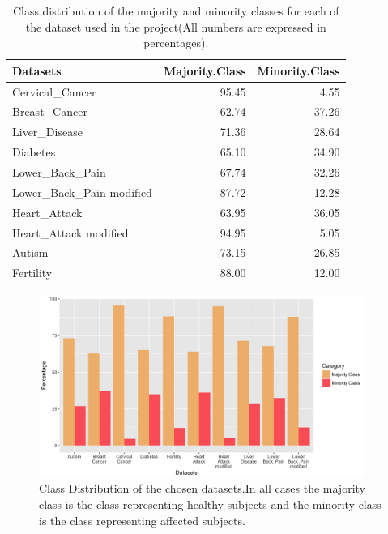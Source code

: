 \begin{table}[!htbp]
\centering
\begin{tabular}{lrr}
  \hline
  \rowcolor{LightCyan}
Datasets & Majority.Class & Minority.Class \\ 
  \hline
Cervical\_Cancer & 95.45 & 4.55 \\ 
  Breast\_Cancer & 62.74 & 37.26 \\ 
  Liver\_Disease & 71.36 & 28.64 \\ 
  Diabetes & 65.10 & 34.90 \\ 
  Lower\_Back\_Pain & 67.74 & 32.26 \\ 
  Lower\_Back\_Pain modified & 87.72 & 12.28 \\ 
  Heart\_Attack & 63.95 & 36.05 \\ 
  Heart\_Attack modified & 94.95 & 5.05 \\ 
  Autism & 73.15 & 26.85 \\ 
  Fertility & 88.00 & 12.00 \\ 
   \hline
\end{tabular}
\caption{Class distribution of the majority and minority classes for each of the dataset used in the project(All numbers are expressed in percentages).}
\label{tab:classDist}
\end{table}

\begin{figure}[!htbp]
    \centering
    \includegraphics[width=0.95\textwidth]{ThesisTemplate/usingLatex/chapter4Images/figure4_1b.png}
    \caption{Class Distribution of the chosen datasets.\newline In all cases the majority class is the class representing healthy subjects and the minority class is the class representing affected subjects.}
    \label{fig:classDistr}
\end{figure}


